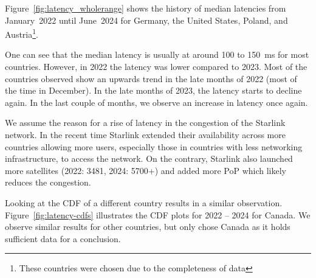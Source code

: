 Figure~\ref{fig:latency_wholerange} shows the history of median latencies from January~2022 until June~2024 for Germany, the United States, Poland, and Austria\footnote{These countries were chosen due to the completeness of data}.

One can see that the median latency is usually at around 100 to 150~ms for most countries. However, in 2022 the latency was lower compared to 2023. Most of the countries observed show an upwards trend in the late months of 2022 (most of the time in December). In the late months of 2023, the latency starts to decline again. In the last couple of months, we observe an increase in latency once again.

We assume the reason for a rise of latency in the congestion of the Starlink network. In the recent time Starlink extended their availability across more countries allowing more users, especially those in countries with less networking infrastructure, to access the network.
On the contrary, Starlink also launched more satellites (2022: 3481, 2024: 5700+) and added more \ac{PoP} which likely reduces the congestion.

Looking at the CDF of a different country results in a similar observation. Figure~\ref{fig:latency-cdfs} illustrates the CDF plots for 2022 -- 2024 for Canada. We observe similar results for other countries, but only chose Canada as it holds sufficient data for a conclusion.

